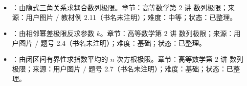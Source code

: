 \begin{knowledgeBox}
\begin{itemize}
  \item {}\textbf{}：由隐式三角关系求耦合数列极限。章节：高等数学第 2 讲 数列极限；来源：用户图片 / 教材例 2.11（书名未注明）；难度：中等；状态：已整理。
  \item {}\textbf{}：由相邻幂差极限反求参数 $k$。章节：高等数学第 2 讲 数列极限；来源：用户图片 / 题号 2.4（书名未注明）；难度：基础；状态：已整理。
  \item {}\textbf{}：由闭区间有界性求指数平均的 $n$ 次方根极限。章节：高等数学第 2 讲 数列极限；来源：用户图片 / 题号 2.7（书名未注明）；难度：基础；状态：已整理。
\end{itemize}
\end{knowledgeBox}
